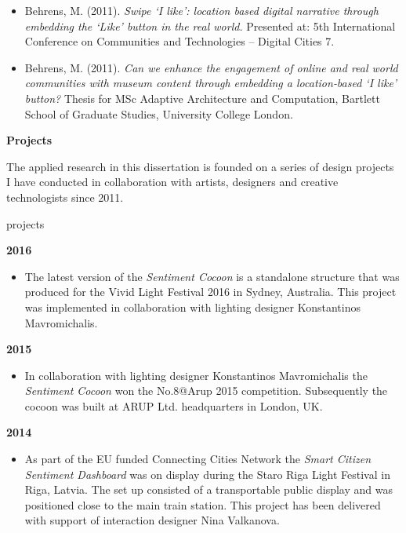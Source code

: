 \begin{acknowledgements}
\begin{singlespace}
{\begin{itemize}
\item Behrens, M. (2011). \textit{Swipe ‘I like’: location based digital narrative through embedding the ‘Like’ button in the real world.} Presented at: 5th International Conference on Communities and Technologies – Digital Cities 7.
\item Behrens, M. (2011). \textit{Can we enhance the engagement of online and real world communities with museum content through embedding a location‐based ‘I like’ button?} Thesis for MSc Adaptive Architecture and Computation, Bartlett School of Graduate Studies, University College London.



\end{itemize}
}
\end{singlespace}

\newpage

\textbf{Projects}
\label{sec:projects}

\begin{singlespace}{
The applied research in this dissertation is founded on a series of design projects I have conducted in collaboration with artists, designers and creative technologists since 2011. 

\begin{labeling}{projects}

\item [\textbf{2016}] 
\begin {itemize} 
\item The latest version of the \textit{Sentiment Cocoon} is a standalone structure that was produced for the Vivid Light Festival 2016 in Sydney, Australia. This project was implemented in collaboration with lighting designer Konstantinos Mavromichalis. 
\end{itemize}

\item [\textbf{2015}] 
\begin {itemize} 
\item In collaboration with lighting designer Konstantinos Mavromichalis the \textit{Sentiment Cocoon} won the No.8@Arup 2015 competition. Subsequently the cocoon was built at ARUP Ltd. headquarters in London, UK. 
\end{itemize}

\item [\textbf{2014}] 
\begin {itemize} 
\item As part of the EU funded Connecting Cities Network the \textit{Smart Citizen Sentiment Dashboard} was on display during the Staro Riga Light Festival in Riga, Latvia. The set up consisted of a transportable public display and was positioned close to the main train station. This project has been delivered with support of interaction designer Nina Valkanova. 


\end{itemize}
\end{labeling}}
\end{singlespace}
\end{acknowledgements}
